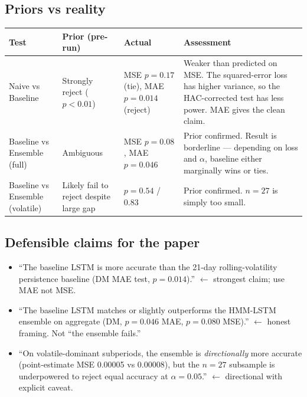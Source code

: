 \documentclass[11pt]{article}
\begin{document}
\subsection*{Priors vs reality}

\begin{center}
\renewcommand{\arraystretch}{1.15}
\begin{tabular}{@{}p{4cm}p{3.5cm}p{4cm}p{3.5cm}@{}}
\toprule
Test & Prior (pre-run) & Actual & Assessment \\
\midrule
Naive vs Baseline                & Strongly reject ($p < 0.01$) & MSE $p=0.17$ (tie), MAE $p=0.014$ (reject) & Weaker than predicted on MSE. The squared-error loss has higher variance, so the HAC-corrected test has less power. MAE gives the clean claim. \\
Baseline vs Ensemble (full)      & Ambiguous                     & MSE $p=0.08$, MAE $p=0.046$               & Prior confirmed. Result is borderline --- depending on loss and $\alpha$, baseline either marginally wins or ties. \\
Baseline vs Ensemble (volatile)  & Likely fail to reject despite large gap & $p=0.54$ / $0.83$                 & Prior confirmed. $n=27$ is simply too small. \\
\bottomrule
\end{tabular}
\end{center}

\subsection*{Defensible claims for the paper}

\begin{itemize}[leftmargin=*]
  \item ``The baseline LSTM is more accurate than the 21-day rolling-volatility persistence baseline (DM MAE test, $p=0.014$).'' $\leftarrow$ strongest claim; use MAE not MSE.
  \item ``The baseline LSTM matches or slightly outperforms the HMM-LSTM ensemble on aggregate (DM, $p=0.046$ MAE, $p=0.080$ MSE).'' $\leftarrow$ honest framing. Not ``the ensemble fails.''
  \item ``On volatile-dominant subperiods, the ensemble is \emph{directionally} more accurate (point-estimate MSE 0.00005 vs 0.00008), but the $n=27$ subsample is underpowered to reject equal accuracy at $\alpha=0.05$.'' $\leftarrow$ directional with explicit caveat.
\end{itemize}
\end{document}
